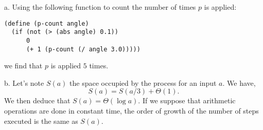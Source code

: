 \documentclass[a4paper,12pt]{article}
\begin{document}
\noindent
a. Using the following function to count the number of times $p$ is
applied:
\begin{lstlisting}
(define (p-count angle)
  (if (not (> (abs angle) 0.1))
      0
      (+ 1 (p-count (/ angle 3.0)))))
\end{lstlisting}
we find that $p$ is applied $5$ times.

\medskip \noindent
b.  Let's note $S(a)$ the space occupied by
the process for an input $a$.  We have,
\[S(a) = S(a/3) + \Theta(1).\]
We then deduce that $S(a) = \Theta(\log a)$. If we suppose that
arithmetic operations are done in constant time, the order of growth
of the number of steps executed is the same as $S(a)$.
\end{document}

